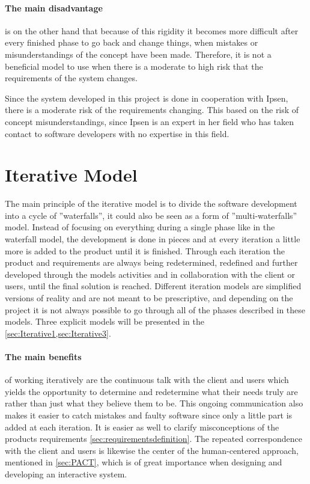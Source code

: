 \paragraph{The main disadvantage} is on the other hand that because of this rigidity it becomes more difficult after every finished phase to go back and change things, when mistakes or misunderstandings of the concept have been made.
Therefore, it is not a beneficial model to use when there is a moderate to high risk that the requirements of the system changes.

Since the system developed in this project is done in cooperation with Ipsen, there is a moderate risk of the requirements changing.
This based on the risk of concept misunderstandings, since Ipsen is an expert in her field who has taken contact to software developers with no expertise in this field.


\section{Iterative Model} \label{sec:iterativModel}
The main principle of the iterative model \cite{Iterative-Toolsqa,InteractionDesign} is to divide the software development into a cycle of ''waterfalls'', it could also be seen as a form of ''multi-waterfalls'' model.
Instead of focusing on everything during a single phase like in the waterfall model, the development is done in pieces and at every iteration a little more is added to the product until it is finished.
Through each iteration the product and requirements are always being redetermined, redefined and further developed through the models activities and in collaboration with the client or users, until the final solution is reached.
Different iteration models are simplified versions of reality and are not meant to be prescriptive, and depending on the project it is not always possible to go through all of the phases described in these models.
Three explicit models will be presented in the \cref{sec:Iterative1,sec:Iterative3}.

\paragraph{The main benefits}
of working iteratively are the continuous talk with the client and users which yields the opportunity to determine and redetermine what their needs truly are rather than just what they believe them to be.
This ongoing communication also makes it easier to catch mistakes and faulty software since only a little part is added at each iteration.
It is easier as well to clarify misconceptions of the products requirements \cref{sec:requirementsdefinition}.
The repeated correspondence with the client and users is likewise the center of the human-centered approach, mentioned in \cref{sec:PACT}, which is of great importance when designing and developing an interactive system.

